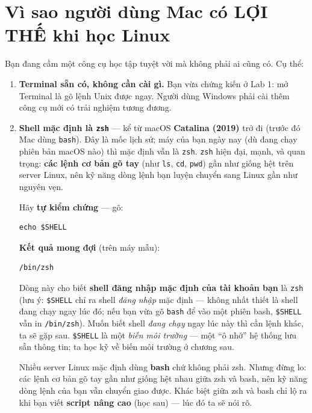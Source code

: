 \documentclass[12pt,a4paper]{article}
\begin{document}
\section{Vì sao người dùng Mac có LỢI THẾ khi học Linux}

Bạn đang cầm một công cụ học tập tuyệt vời mà không phải ai cũng có. Cụ thể:

\begin{enumerate}[leftmargin=*]
  \item \textbf{Terminal sẵn có, không cần cài gì.} Bạn vừa chứng kiến ở Lab 1: mở Terminal là gõ lệnh Unix được ngay. Người dùng Windows phải cài thêm công cụ mới có trải nghiệm tương đương.

  \item \textbf{Shell mặc định là \texttt{zsh}} — kể từ macOS \textbf{Catalina (2019)} trở đi (trước đó Mac dùng \texttt{bash}). Đây là mốc lịch sử; máy của bạn ngày nay (dù đang chạy phiên bản macOS nào) thì mặc định vẫn là \texttt{zsh}. \texttt{zsh} hiện đại, mạnh, và quan trọng: \textbf{các lệnh cơ bản gõ tay} (như \texttt{ls}, \texttt{cd}, \texttt{pwd}) gần như giống hệt trên server Linux, nên kỹ năng dòng lệnh bạn luyện chuyển sang Linux gần như nguyên vẹn.

  Hãy \textbf{tự kiểm chứng} — gõ:
  \begin{labbox}[Lệnh]
\begin{verbatim}
echo $SHELL
\end{verbatim}
  \end{labbox}
  \textbf{Kết quả mong đợi} (trên máy mẫu):
  \begin{termbox}
\begin{verbatim}
/bin/zsh
\end{verbatim}
  \end{termbox}
  Dòng này cho biết \textbf{shell đăng nhập mặc định của tài khoản bạn} là \texttt{zsh} (lưu ý: \texttt{\$SHELL} chỉ ra shell \textit{đăng nhập} mặc định — không nhất thiết là shell đang chạy ngay lúc đó; nếu bạn vừa gõ \texttt{bash} để vào một phiên bash, \texttt{\$SHELL} vẫn in \texttt{/bin/zsh}). Muốn biết shell \textit{đang chạy} ngay lúc này thì cần lệnh khác, ta sẽ gặp sau. \texttt{\$SHELL} là một \textit{biến môi trường} — một ``ô nhớ'' hệ thống lưu sẵn thông tin; ta học kỹ về biến môi trường ở chương sau.

  \begin{notebox}
  Nhiều server Linux mặc định dùng \textbf{bash} chứ không phải zsh. Nhưng đừng lo: các lệnh cơ bản gõ tay gần như giống hệt nhau giữa zsh và bash, nên kỹ năng dòng lệnh của bạn vẫn chuyển giao được. Khác biệt giữa zsh và bash chỉ lộ ra khi bạn viết \textbf{script nâng cao} (học sau) — lúc đó ta sẽ nói rõ.
  \end{notebox}


\end{enumerate}
\end{document}
